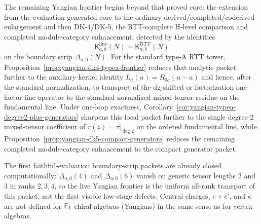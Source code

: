 The remaining Yangian frontier begins beyond that proved core: the
extension from the evaluation-generated core to the
ordinary-derived/completed/coderived enlargement and then DK-4/DK-5, the
RTT-complete H-level comparison and completed
module-category enhancement, detected by the identities
\[
\mathsf{K}^{\mathrm{line}}_{a,b}(N)
=\mathsf{K}^{\mathrm{RTT}}_{a,b}(N)
\]
on the boundary strip $\Delta_{a,0}(N)$.  For the standard type-A RTT
tower, Proposition~\ref{prop:yangian-dk4-typea-frontier} reduces that
analytic packet further to the auxiliary-kernel identity
$L_a(u)=R_{0a}(u-a)$ and hence, after the standard normalization, to
transport of the dg-shifted or factorization one-factor line operator
to the standard normalized mixed-tensor residue on the fundamental
line.  Under one-loop exactness,
Corollary~\ref{cor:yangian-typea-degree2-plus-generators} sharpens this
local packet further to the single degree-$2$ mixed-tensor coefficient
of $r(z)=\tau|_{\deg 2}$ on the ordered fundamental line, while
Proposition~\ref{prop:yangian-dk5-compact-generators} reduces the
remaining completed module-category enhancement to the compact
generator packet.

The first faithful-evaluation boundary-strip
packets are already closed computationally:
$\Delta_{a,0}(4)$ and $\Delta_{a,0}(6)$ vanish on generic tensor
lengths $2$ and $3$ in ranks $2,3,4$, so the live Yangian frontier is
the uniform all-rank transport of this packet, not the first visible
low-stage defects.
Central charges, $c{+}c'$, and $\kappa$ are not defined for
$\mathsf{E}_1$-chiral algebras (Yangians) in the same sense as for
vertex algebras.

